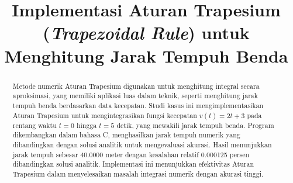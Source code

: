 \documentclass[conference]{IEEEtran}
\begin{document}
\title{Implementasi Aturan Trapesium (\textit{Trapezoidal Rule}) untuk Menghitung Jarak Tempuh Benda}

\author{
\and
{}
\and
{}
\and
{}
}

\maketitle

\begin{abstract}
Metode numerik Aturan Trapesium digunakan untuk menghitung integral secara aproksimasi, yang memiliki aplikasi luas dalam teknik, seperti menghitung jarak tempuh benda berdasarkan data kecepatan. Studi kasus ini mengimplementasikan Aturan Trapesium untuk mengintegrasikan fungsi kecepatan \( v(t) = 2t + 3 \) pada rentang waktu \( t = 0 \) hingga \( t = 5 \) detik, yang mewakili jarak tempuh benda. Program dikembangkan dalam bahasa C, menghasilkan jarak tempuh numerik yang dibandingkan dengan solusi analitik untuk mengevaluasi akurasi. Hasil menunjukkan jarak tempuh sebesar 40.0000 meter dengan kesalahan relatif 0.000125 persen dibandingkan solusi analitik. Implementasi ini menunjukkan efektivitas Aturan Trapesium dalam menyelesaikan masalah integrasi numerik dengan akurasi tinggi.
\end{abstract}
\end{document}
